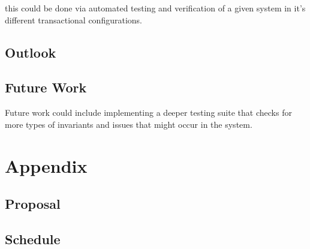 \documentclass[a4paper,10pt,titlepage]{report}
\begin{document}
this could be done via automated testing and verification of a given system in it's different transactional configurations.

    \section*{Outlook}


    \section{Future Work}
    Future work could include implementing a deeper testing suite that checks for more types of invariants and issues that might occur in the system.





    \newpage


    \chapter{Appendix}

    \pagestyle{empty}
    \printbibliography


    \section{Proposal}
    


    \section{Schedule}

\end{document}
